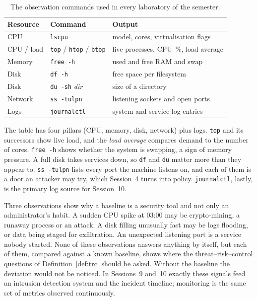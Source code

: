 \begin{table}[h]
\centering
\small
\begin{tabular}{@{}lll@{}}
\toprule
\textbf{Resource} & \textbf{Command} & \textbf{Output} \\
\midrule
CPU          & \texttt{lscpu}                 & model, cores, virtualisation flags \\
CPU / load   & \texttt{top} / \texttt{htop} / \texttt{btop} & live processes, CPU~\%, load average \\
Memory       & \texttt{free -h}               & used and free RAM and swap \\
Disk         & \texttt{df -h}                 & free space per filesystem \\
Disk         & \texttt{du -sh} \emph{dir}     & size of a directory \\
Network      & \texttt{ss -tulpn}             & listening sockets and open ports \\
Logs         & \texttt{journalctl}            & system and service log entries \\
\bottomrule
\end{tabular}
\caption{The observation commands used in every laboratory of the semester.}
\label{tab:baseline}
\end{table}

The table has four pillars (CPU, memory, disk, network) plus logs.
\texttt{top} and its successors show live load, and the \emph{load average}
compares demand to the number of cores. \texttt{free -h} shows whether the
system is swapping, a sign of memory pressure. A full disk takes services
down, so \texttt{df} and \texttt{du} matter more than they appear to.
\texttt{ss -tulpn} lists every port the machine listens on, and each of them
is a door an attacker may try, which Session~4 turns into policy.
\texttt{journalctl}, lastly, is the primary log source for Session~10.

\begin{example}\label{ex:spike}
Three observations show why a baseline is a security tool and not only an
administrator's habit. A sudden CPU spike at 03:00 may be crypto-mining, a
runaway process or an attack. A disk filling unusually fast may be logs
flooding, or data being staged for exfiltration. An unexpected listening
port is a service nobody started. None of these observations answers
anything by itself, but each of them, compared against a known baseline,
shows where the threat--risk--control questions of Definition~\ref{def:trc}
should be asked.
Without the baseline the deviation would not be noticed. In Sessions~9 and~10
exactly these signals feed an intrusion detection system and the incident
timeline; monitoring is the same set of metrics observed continuously.
\end{example}

